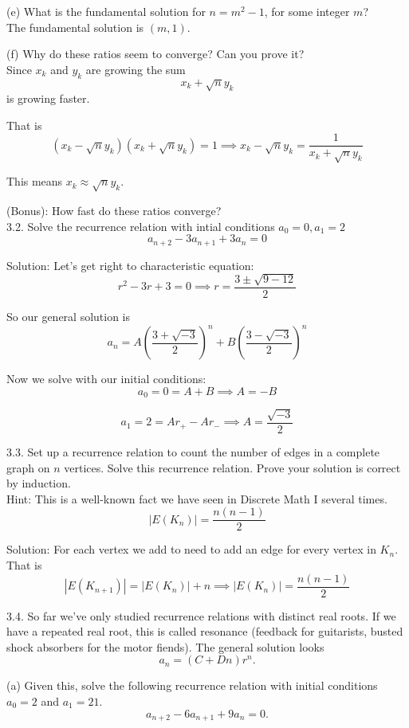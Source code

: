 \documentclass[16 pt]{amsart}
\theoremstyle{definition}
\theoremstyle{remark}
\numberwithin{equation}{subsection}
\begin{document}
(e) What is the fundamental solution for $n = m^2-1$, for some integer $m$?\\

The fundamental solution is $(m,1)$.


(f) Why do these ratios seem to converge?  Can you prove it?\\


Since $x_k$ and $y_k$ are growing the sum
\[
x_k + \sqrt{n}y_k 
\]
is growing faster.

That is
\[
(x_k-\sqrt{n}y_k)(x_k+\sqrt{n}y_k) = 1 \implies x_k-\sqrt{n}y_k = \frac{1}{x_k+\sqrt{n}y_k}
\]

This means $x_k \approx \sqrt{n} y_k$.

(Bonus): How fast do these ratios converge?\\



3.2.  Solve the recurrence relation with intial conditions $a_0 = 0, a_1 = 2$
\[
a_{n+2} - 3a_{n+1} + 3a_n = 0
\]

Solution: Let's get right to characteristic equation:
\[
r^2 - 3r + 3 = 0 \implies r = \frac{3 \pm \sqrt{9-12}}{2}
\]

So our general solution is
\[
a_n = A\left(\frac{3+\sqrt{-3}}{2}\right)^n + B\left(\frac{3-\sqrt{-3}}{2}\right)^n
\]

Now we solve with our initial conditions:
\[
a_0 = 0 = A+B \implies A=-B
\]

\[
a_1 = 2 = Ar_+ - Ar_- \implies A = \frac{\sqrt{-3}}{2}
\]



3.3.  Set up a recurrence relation to count the number of edges in a complete graph on $n$ vertices.  Solve this recurrence relation.  Prove your solution is correct by induction.\\

Hint: This is a well-known fact we have seen in Discrete Math I several times.
\[
|E(K_n)| = \frac{n(n-1)}{2}
\]


Solution: For each vertex we add to need to add an edge for every vertex in $K_n$.  That is
\[
|E(K_{n+1})| = |E(K_n)| + n \implies |E(K_n)| = \frac{n(n-1)}{2} 
\]


3.4. So far we've only studied recurrence relations with distinct real roots.  If we have a repeated real root, this is called resonance (feedback for guitarists, busted shock absorbers for the motor fiends).  The general solution looks 
\[
a_n = (C+Dn)r^n.
\]

(a) Given this, solve the following recurrence relation with initial conditions $a_0=2$ and $a_1=21$.
\[
a_{n+2}-6a_{n+1}+9a_n =0.
\]
\end{document}
